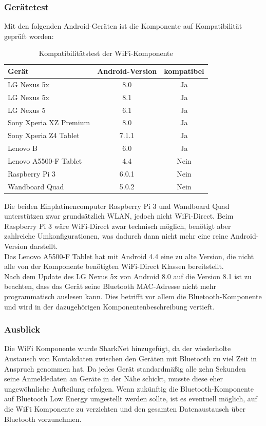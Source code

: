 \subsubsection{Gerätetest}
Mit den folgenden Android-Geräten ist die Komponente auf Kompatibilität geprüft worden:\\
\begin{table}[H]
	\begin{center}
		\begin{tabular}{l|c|c} 			
			Gerät & Android-Version & kompatibel \\
			\hline
			LG Nexus 5x & 8.0 & Ja\\
			LG Nexus 5x & 8.1 & Ja\\
			LG Nexus 5 & 6.1 & Ja\\
			Sony Xperia XZ Premium & 8.0 & Ja\\
			Sony Xperia Z4 Tablet & 7.1.1 & Ja\\
			Lenovo B & 6.0 & Ja\\
			Lenovo A5500-F Tablet & 4.4 & Nein\\
			Raspberry Pi 3 & 6.0.1 & Nein\\	
			Wandboard Quad & 5.0.2 & Nein\\			
		\end{tabular}
		\caption{Kompatibilitätstest der WiFi-Komponente}
		\label{tab:dimensions}
	\end{center}
\end{table}
Die beiden Einplatinencomputer Raspberry Pi 3 und Wandboard Quad unterstützen zwar grundsätzlich WLAN, jedoch nicht WiFi-Direct. Beim Raspberry Pi 3 wäre WiFi-Direct zwar technisch möglich, benötigt aber zahlreiche Umkonfigurationen, was dadurch dann nicht mehr eine reine Android-Version darstellt. 
\\Das Lenovo A5500-F Tablet hat mit Android 4.4 eine zu alte Version, die nicht alle von der Komponente benötigten WiFi-Direct Klassen bereitstellt. 
\\Nach dem Update des LG Nexus 5x von Android 8.0 auf die Version 8.1 ist zu beachten, dass das Gerät seine Bluetooth MAC-Adresse nicht mehr programmatisch auslesen kann. Dies betrifft vor allem die Bluetooth-Komponente und wird in der dazugehörigen Komponentenbeschreibung vertieft.  

\subsubsection{Ausblick}
Die WiFi Komponente wurde SharkNet hinzugefügt, da der wiederholte Austausch von Kontakdaten zwischen den Geräten mit Bluetooth zu viel Zeit in Anspruch genommen hat. Da jedes Gerät standardmäßig alle zehn Sekunden seine Anmeldedaten an Geräte in der Nähe schickt, musste diese eher ungewöhnliche Aufteilung erfolgen. Wenn zukünftig die Bluetooth-Komponente auf Bluetooth Low Energy umgestellt werden sollte, ist es eventuell möglich, auf die WiFi Komponente zu verzichten und den gesamten Datenaustausch über Bluetooth vorzunehmen. 
\newpage